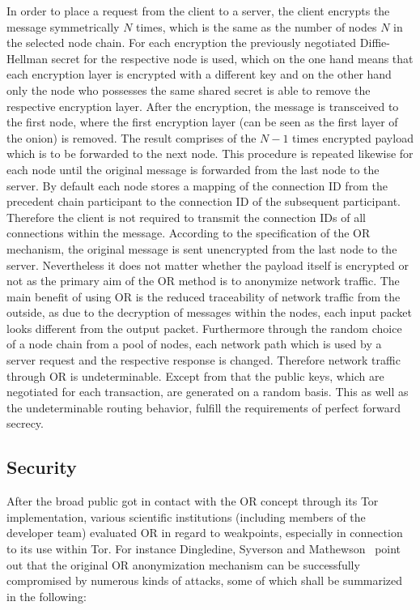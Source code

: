 \documentclass{sig-alternate}
\begin{document}
In order to place a request from the client to a server, the client encrypts the message symmetrically $N$ times, which is the same as the number of nodes $N$ in the selected node chain. For each encryption the previously negotiated Diffie-Hellman secret for the respective node is used, which on the one hand means that each encryption layer is encrypted with a different key and on the other hand only the node who possesses the same shared secret is able to remove the respective encryption layer.
After the encryption, the message is transceived to the first node, where the first encryption layer (can be seen as the first layer of the onion) is removed. The result comprises of the $N-1$ times encrypted payload which is to be forwarded to the next node. This procedure is repeated likewise for each node until the original message is forwarded from the last node to the server. By default each node stores a mapping of the connection ID from the precedent chain participant to the connection ID of the subsequent participant. Therefore the client is not required to transmit the connection IDs of all connections within the message. According to the specification of the OR mechanism, the original message is sent unencrypted from the last node to the server. Nevertheless it does not matter whether the payload itself is encrypted or not as the primary aim of the OR method is to anonymize network traffic.
The main benefit of using OR is the reduced traceability of network traffic from the outside, as due to the decryption of messages within the nodes, each input packet looks different from the output packet. Furthermore through the random choice of a node chain from a pool of nodes, each network path which is used by a server request and the respective response is changed. Therefore network traffic through OR is undeterminable. Except from that the public keys, which are negotiated for each transaction, are generated on a random basis. This as well as the undeterminable routing behavior, fulfill the requirements of perfect forward secrecy.~\cite{diffie1992authentication}

\subsection{Security}

After the broad public got in contact with the OR concept through its Tor implementation, various scientific institutions (including members of the developer team) evaluated OR in regard to weakpoints, especially in connection to its use within Tor. For instance Dingledine, Syverson and Mathewson~\cite{dingledine2004tor} point out that the original OR anonymization mechanism can be successfully compromised by numerous kinds of attacks, some of which shall be summarized in the following:
\end{document}

